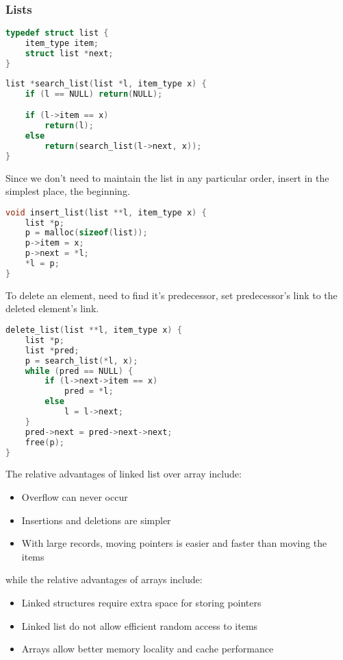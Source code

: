 \documentclass[10pt]{article}
\theoremstyle{definition}
\begin{document}
\subsubsection{Lists}
\begin{lstlisting}[language=C]
typedef struct list {
    item_type item;
    struct list *next;
}
\end{lstlisting}
\begin{lstlisting}[language=C]
list *search_list(list *l, item_type x) {
    if (l == NULL) return(NULL);

    if (l->item == x)
        return(l);
    else
        return(search_list(l->next, x));
}
\end{lstlisting}
Since we don't need to maintain the list in any particular order, insert in the simplest place, the beginning.
\begin{lstlisting}[language=C]
void insert_list(list **l, item_type x) {
    list *p;
    p = malloc(sizeof(list));
    p->item = x;
    p->next = *l;
    *l = p;
}
\end{lstlisting}
To delete an element, need to find it's predecessor, set predecessor's link to the deleted element's link.
\begin{lstlisting}[language=C]
delete_list(list **l, item_type x) {
    list *p;
    list *pred;
    p = search_list(*l, x);
    while (pred == NULL) {
        if (l->next->item == x)
            pred = *l;
        else
            l = l->next;
    }
    pred->next = pred->next->next;
    free(p);
}
\end{lstlisting}

The relative advantages of linked list over array include:
\begin{itemize}
    \item Overflow can never occur
    \item Insertions and deletions are simpler
    \item With large records, moving pointers is easier and faster than moving the items
\end{itemize}
while the relative advantages of arrays include:
\begin{itemize}
    \item Linked structures require extra space for storing pointers
    \item Linked list do not allow efficient random access to items
    \item Arrays allow better memory locality and cache performance
\end{itemize}
\end{document}
